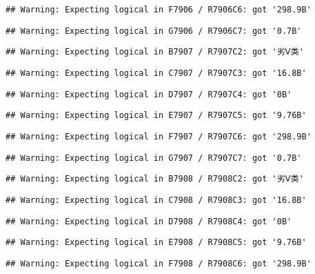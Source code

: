 \documentclass[
]{article}
\begin{document}
\begin{verbatim}
## Warning: Expecting logical in F7906 / R7906C6: got '298.9B'
\end{verbatim}

\begin{verbatim}
## Warning: Expecting logical in G7906 / R7906C7: got '0.7B'
\end{verbatim}

\begin{verbatim}
## Warning: Expecting logical in B7907 / R7907C2: got '劣Ⅴ类'
\end{verbatim}

\begin{verbatim}
## Warning: Expecting logical in C7907 / R7907C3: got '16.8B'
\end{verbatim}

\begin{verbatim}
## Warning: Expecting logical in D7907 / R7907C4: got '0B'
\end{verbatim}

\begin{verbatim}
## Warning: Expecting logical in E7907 / R7907C5: got '9.76B'
\end{verbatim}

\begin{verbatim}
## Warning: Expecting logical in F7907 / R7907C6: got '298.9B'
\end{verbatim}

\begin{verbatim}
## Warning: Expecting logical in G7907 / R7907C7: got '0.7B'
\end{verbatim}

\begin{verbatim}
## Warning: Expecting logical in B7908 / R7908C2: got '劣Ⅴ类'
\end{verbatim}

\begin{verbatim}
## Warning: Expecting logical in C7908 / R7908C3: got '16.8B'
\end{verbatim}

\begin{verbatim}
## Warning: Expecting logical in D7908 / R7908C4: got '0B'
\end{verbatim}

\begin{verbatim}
## Warning: Expecting logical in E7908 / R7908C5: got '9.76B'
\end{verbatim}

\begin{verbatim}
## Warning: Expecting logical in F7908 / R7908C6: got '298.9B'
\end{verbatim}
\end{document}
